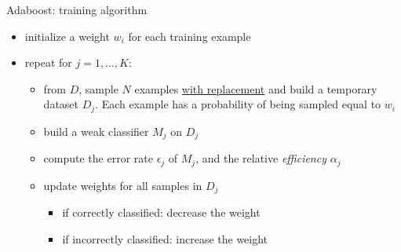 \begin{frame}{Adaboost: training algorithm}
\begin{itemize}
\item initialize a weight $w_i$ for each training example
\item repeat for $j=1,\ldots,K$:
\begin{itemize}
\item from $D$, sample $N$ examples \underline{with replacement} and build a temporary dataset $D_j$. Each example has a probability of being sampled equal to $w_i$
\item build a weak classifier $M_j$ on $D_j$
\item compute the error rate $\epsilon_j$ of $M_j$, and the relative \emph{efficiency} $\alpha_j$
\item update weights for all samples in $D_j$
\begin{itemize}
\item if correctly classified: decrease the weight
\item if incorrectly classified: increase the weight
\end{itemize}
\end{itemize}
\end{itemize}
\end{frame}
